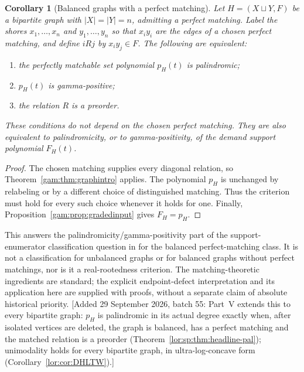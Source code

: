 \documentclass[11pt]{article}
\numberwithin{equation}{section}
\newtheorem{corollary}[theorem]{Corollary}
\theoremstyle{definition}
\begin{document}
\begin{corollary}[Balanced graphs with a perfect matching]\label{gam:cor:balanced}
Let $H=(X\sqcup Y,F)$ be a bipartite graph with $|X|=|Y|=n$, admitting a
perfect matching. Label the shores $x_1,\ldots,x_n$ and $y_1,\ldots,y_n$ so
that $x_iy_i$ are the edges of a chosen perfect matching, and define
$iRj$ by $x_iy_j\in F$. The following are equivalent:
\begin{enumerate}[label=(\roman*),itemsep=1pt,topsep=3pt]
\item the perfectly matchable set polynomial $p_H(t)$ is palindromic;
\item $p_H(t)$ is gamma-positive;
\item the relation $R$ is a preorder.
\end{enumerate}
These conditions do not depend on the chosen perfect matching. They are also
equivalent to palindromicity, or to gamma-positivity, of the demand support
polynomial $F_H(t)$.
\end{corollary}
\begin{proof}
The chosen matching supplies every diagonal relation, so
Theorem~\ref{gam:thm:graphintro} applies. The polynomial $p_H$ is unchanged by
relabeling or by a different choice of distinguished matching. Thus the
criterion must hold for every such choice whenever it holds for one.
Finally, Proposition~\ref{gam:prop:gradedinput} gives $F_H=p_H$.
\end{proof}
This answers the palindromicity/gamma-positivity part of the
support-enumerator classification question in \cite[Problem~5.3]{DHLTW}
for the balanced perfect-matching class. It is not a classification for
unbalanced graphs or for balanced graphs without perfect matchings, nor is
it a real-rootedness criterion. The matching-theoretic ingredients are
standard; the explicit endpoint-defect interpretation and its application
here are supplied with proofs, without a separate claim of absolute
historical priority.
[Added 29 September 2026, batch 55: Part~V extends this to every
bipartite graph: $p_H$ is palindromic in its actual degree exactly when,
after isolated vertices are deleted, the graph is balanced, has a perfect
matching and the matched relation is a preorder
(Theorem~\ref{lor:sp:thm:headline-pal}); unimodality holds for every
bipartite graph, in ultra-log-concave form (Corollary~\ref{lor:cor:DHLTW}).]
\end{document}
